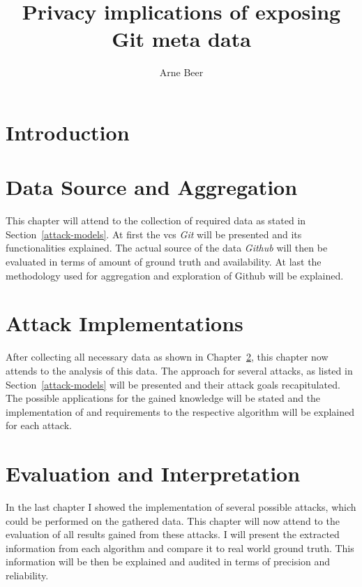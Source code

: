 \documentclass{thesis}
\title{Privacy implications of exposing Git meta data}
\author{Arne Beer}
\begin{document}

\cleardoublepage{}


\clearpage



{\small \tableofcontents}



\chapter{Introduction}




\chapter{Data Source and Aggregation}\label{data}
This chapter will attend to the collection of required data as stated in Section~\ref{attack-models}.
At first the \ac{vcs} \emph{Git} will be presented and its functionalities explained.
The actual source of the data \emph{Github} will then be evaluated in terms of amount of ground truth and availability.
At last the methodology used for aggregation and exploration of Github will be explained.








\chapter{Attack Implementations}\label{implementation}
After collecting all necessary data as shown in Chapter~\ref{data}, this chapter now attends to the analysis of this data.
The approach for several attacks, as listed in Section~\ref{attack-models} will be presented and their attack goals recapitulated.
The possible applications for the gained knowledge will be stated and the implementation of and requirements to the respective algorithm will be explained for each attack.







\chapter{Evaluation and Interpretation}\label{evaluation}
In the last chapter I showed the implementation of several possible attacks, which could be performed on the gathered data.
This chapter will now attend to the evaluation of all results gained from these attacks.
I will present the extracted information from each algorithm and compare it to real world ground truth.
This information will be then be explained and audited in terms of precision and reliability.
\end{document}
